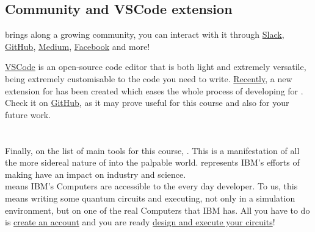 \documentclass[aspectratio=43]{beamer}
\begin{document}
\subsection{Community and VSCode extension}
\begin{frame}
    \begin{card}[Community]
        \qk brings along a growing community, you can interact with it through \href{https://qiskit.slack.com/}{Slack}, \href{https://github.com/Qiskit}{GitHub}, \href{https://medium.com/qiskit}{Medium}, \href{https://www.facebook.com/qiskit/}{Facebook} and more!
    \end{card}
    \begin{card}
        \href{https://code.visualstudio.com/}{VSCode} is an open-source code editor that is both light and extremely versatile, being extremely customisable to the code you need to write. \href{https://medium.com/qiskit/qiskit-vscode-extension-a-new-tool-to-enhance-your-quantum-programming-experience-951cc8c1954b}{Recently}, a new extension for \qk has been created which eases the whole process of developing for \qk. Check it on \href{https://github.com/Qiskit/qiskit-vscode}{GitHub}, as it may prove useful for this course and also for your future work.
    \end{card}
\pagenumber
\end{frame}

\section{\ibmqe}
\begin{frame}{\ibmqe}
\begin{card}
    Finally, on the list of main tools for this course, \ibmqe. This is a manifestation of all the more sidereal nature of \qk into the palpable world. \ibmq represents IBM's efforts of making \qc have an impact on industry and science.\\
    \ibmqe means IBM's \q Computers are accessible to the every day developer. To us, this means writing some quantum circuits and executing, not only in a simulation environment, but on one of the real \q Computers that IBM has. All you have to do is \href{https://quantumexperience.ng.bluemix.net/qx/signup}{create an account} and you are ready \href{https://quantumexperience.ng.bluemix.net/qx/editor}{design and execute your circuits}!
\end{card}
\pagenumber
\end{frame}
\end{document}
